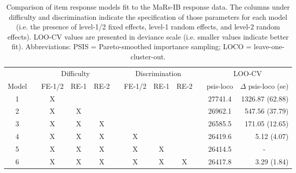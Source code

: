 \documentclass[a4paper,man,natbib]{apa6}
\begin{document}
\begin{table}
    \centering
    \begin{tabular*}{1.02\textwidth}{cccccccccccr}
    \toprule
    && \multicolumn{3}{c}{Difficulty} && \multicolumn{3}{c}{Discrimination} && \multicolumn{2}{c}{LOO-CV} \\
    \cmidrule(lr){3-5}\cmidrule(lr){7-9}\cmidrule(lr){11-12}
    Model && {\small FE-1/2} & {\small RE-1} & {\small RE-2} && {\small FE-1/2} & {\small RE-1} & {\small RE-2} && psis-loco & $\Delta$ psis-loco (se) \\
    \midrule
    1 && X &   &   &&   &   &   && 27741.4 & 1326.87 (62.88) \\
    2 && X & X &   &&   &   &   && 26962.1 & 547.56 (37.79) \\
    3 && X & X & X &&   &   &   && 26585.5 & 171.05 (12.65) \\
    4 && X & X & X && X &   &   && 26419.6 & 5.12 (4.07) \\
    5 && X & X & X && X & X &   && 26414.5 & \multicolumn{1}{c}{-} \\
    6 && X & X & X && X & X & X && 26417.8 & 3.29 (1.84) \\
    \bottomrule
    \end{tabular*}
    \caption{\label{tab:2}\normalfont Comparison of item response models fit to the MaRs-IB response data. The columns under difficulty and discrimination indicate the specification of those parameters for each model (i.e. the presence of level-1/2 fixed effects, level-1 random effects, and level-2 random effects). LOO-CV values are presented in deviance scale (i.e. smaller values indicate better fit). Abbreviations: PSIS = Pareto-smoothed importance sampling; LOCO = leave-one-cluster-out.}
    \label{table:2}
\end{table}
\end{document}
